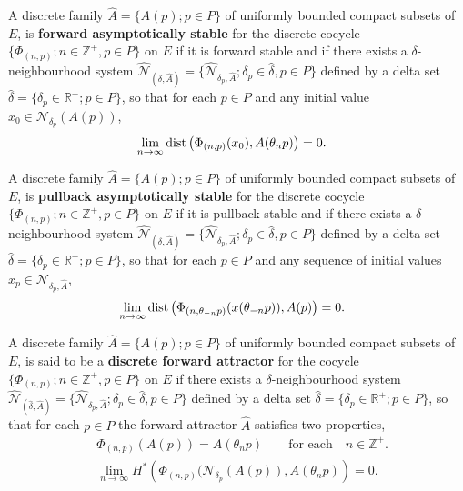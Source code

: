 \begin{defn} \label{DFASdef}
   A discrete family $\hat{A} = \{A(p);p \in P\}$ of
   uniformly bounded compact subsets of $E$, is {\bf
   forward asymptotically stable} for the discrete cocycle
   $\{\Phi_{(n, p)}; n \in \mathbb{Z}^{+}, p \in P\}$ on $E$ if it is forward
   stable and if there exists a $\delta$-neighbourhood system
   $\hat{\mathcal{N}}_{(\hat{\delta} ,\hat{A})} =
   \{\hat{\mathcal{N}}_{\delta_p, \hat{A}}; \delta_p \in \hat{\delta}, p \in P
   \}$ defined by a delta set $\hat{\delta} = \{\delta_p \in \mathbb{R}^+; p
   \in P\}$, so that for each $p \in P$ and any initial value
   $x_0 \in \mathcal{N}_{\delta_p}(A(p))$,
   \begin{align}
      & \lim_{n \to \infty} {\rm dist} \left(\Phi_{(n, p)}
           (x_0), A(\theta_n p) \right) = 0.
   \end{align}
\end{defn}

\begin{defn} \label{DPASdef}
   A discrete family $\hat{A} = \{A(p);p \in P\}$ of
   uniformly bounded compact subsets of $E$, is {\bf
   pullback asymptotically stable} for the discrete cocycle
   $\{\Phi_{(n, p)}; n \in \mathbb{Z}^{+}, p \in P\}$ on $E$ if it is pullback
   stable and if there exists a $\delta$-neighbourhood system
   $\hat{\mathcal{N}}_{(\hat{\delta} ,\hat{A})} =
   \{\hat{\mathcal{N}}_{\delta_p, \hat{A}}; \delta_p \in \hat{\delta}, p \in P
   \}$ defined by a delta set $\hat{\delta} = \{\delta_p \in \mathbb{R}^+; p
   \in P\}$, so that for each $p \in P$ and any sequence of initial values
   $\hat{x}_p \in \mathcal{N}_{\delta_p, \hat{A}}$,
   \begin{align}
      & \lim_{n \to \infty} {\rm dist} \left(\Phi_{(n, \theta_{-n}p)}
           (x(\theta_{-n}p)), A(p) \right) = 0.
   \end{align}
\end{defn}

\begin{defn} \label{DFAdef}
   A discrete family $\hat{A} = \{A(p);p \in P\}$ of
   uniformly bounded compact subsets of $E$, is said to be a {\bf
   discrete forward attractor} for the cocycle $\{\Phi_{(n, p)}; n \in
   \mathbb{Z}^{+}, p \in P\}$ on $E$ if there exists a
   $\delta$-neighbourhood system $\hat{\mathcal{N}}_{(\hat{\delta}
   ,\hat{A})} = \{\hat{\mathcal{N}}_{\delta_p, \hat{A}}; \delta_p \in
   \hat{\delta}, p \in P \}$ defined by a delta set $\hat{\delta} =
   \{\delta_p \in \mathbb{R}^+; p \in P\}$, so that for each $p
   \in P$ the forward attractor $\hat{A}$ satisfies two
   properties,
   \begin{align}
      & \Phi_{(n,p)} \left( A(p) \right) = A(\theta_n p) \qquad
                \text{for each} \quad n \in \mathbb{Z}^{+}. \\
      & \lim_{n \to \infty} H^{*} \left(\Phi_{(n, p)}
           (\mathcal{N}_{\delta_{p}}(A(p)), A(\theta_{n}p)
           \right) = 0.
   \end{align}
\end{defn}

